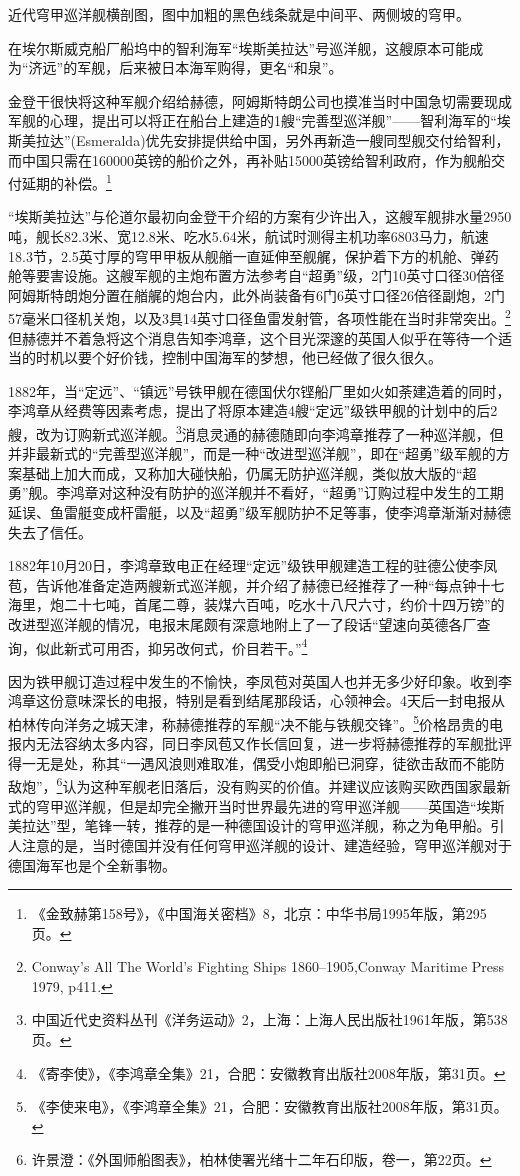 \documentclass[12pt,UTF8]{ctexbook}
\begin{document}
近代穹甲巡洋舰横剖图，图中加粗的黑色线条就是中间平、两侧坡的穹甲。

在埃尔斯威克船厂船坞中的智利海军“埃斯美拉达”号巡洋舰，这艘原本可能成为“济远”的军舰，后来被日本海军购得，更名“和泉”。

金登干很快将这种军舰介绍给赫德，阿姆斯特朗公司也摸准当时中国急切需要现成军舰的心理，提出可以将正在船台上建造的1艘“完善型巡洋舰”——智利海军的“埃斯美拉达”(Esmeralda)优先安排提供给中国，另外再新造一艘同型舰交付给智利，而中国只需在160000英镑的船价之外，再补贴15000英镑给智利政府，作为舰船交付延期的补偿。\footnote{《金致赫第158号》，《中国海关密档》8，北京：中华书局1995年版，第295页。}

“埃斯美拉达”与伦道尔最初向金登干介绍的方案有少许出入，这艘军舰排水量2950吨，舰长82.3米、宽12.8米、吃水5.64米，航试时测得主机功率6803马力，航速18.3节，2.5英寸厚的穹甲甲板从舰艏一直延伸至舰艉，保护着下方的机舱、弹药舱等要害设施。这艘军舰的主炮布置方法参考自“超勇”级，2门10英寸口径30倍径阿姆斯特朗炮分置在艏艉的炮台内，此外尚装备有6门6英寸口径26倍径副炮，2门57毫米口径机关炮，以及3具14英寸口径鱼雷发射管，各项性能在当时非常突出。\footnote{Conway's All The World's Fighting Ships 1860--1905,Conway Maritime Press 1979, p411.}但赫德并不着急将这个消息告知李鸿章，这个目光深邃的英国人似乎在等待一个适当的时机以要个好价钱，控制中国海军的梦想，他已经做了很久很久。

1882年，当“定远”、“镇远”号铁甲舰在德国伏尔铿船厂里如火如荼建造着的同时，李鸿章从经费等因素考虑，提出了将原本建造4艘“定远”级铁甲舰的计划中的后2艘，改为订购新式巡洋舰。\footnote{中国近代史资料丛刊《洋务运动》2，上海：上海人民出版社1961年版，第538页。}消息灵通的赫德随即向李鸿章推荐了一种巡洋舰，但并非最新式的“完善型巡洋舰”，而是一种“改进型巡洋舰”，即在“超勇”级军舰的方案基础上加大而成，又称加大碰快船，仍属无防护巡洋舰，类似放大版的“超勇”舰。李鸿章对这种没有防护的巡洋舰并不看好，“超勇”订购过程中发生的工期延误、鱼雷艇变成杆雷艇，以及“超勇”级军舰防护不足等事，使李鸿章渐渐对赫德失去了信任。

1882年10月20日，李鸿章致电正在经理“定远”级铁甲舰建造工程的驻德公使李凤苞，告诉他准备定造两艘新式巡洋舰，并介绍了赫德已经推荐了一种“每点钟十七海里，炮二十七吨，首尾二尊，装煤六百吨，吃水十八尺六寸，约价十四万镑”的改进型巡洋舰的情况，电报末尾颇有深意地附上了一了段话“望速向英德各厂查询，似此新式可用否，抑另改何式，价目若干。”\footnote{《寄李使》，《李鸿章全集》21，合肥：安徽教育出版社2008年版，第31页。}

因为铁甲舰订造过程中发生的不愉快，李凤苞对英国人也并无多少好印象。收到李鸿章这份意味深长的电报，特别是看到结尾那段话，心领神会。4天后一封电报从柏林传向洋务之城天津，称赫德推荐的军舰“决不能与铁舰交锋”。\footnote{《李使来电》，《李鸿章全集》21，合肥：安徽教育出版社2008年版，第31页。}价格昂贵的电报内无法容纳太多内容，同日李凤苞又作长信回复，进一步将赫德推荐的军舰批评得一无是处，称其“一遇风浪则难取准，偶受小炮即船已洞穿，徒欲击敌而不能防敌炮”，\footnote{许景澄：《外国师船图表》，柏林使署光绪十二年石印版，卷一，第22页。}认为这种军舰老旧落后，没有购买的价值。并建议应该购买欧西国家最新式的穹甲巡洋舰，但是却完全撇开当时世界最先进的穹甲巡洋舰——英国造“埃斯美拉达”型，笔锋一转，推荐的是一种德国设计的穹甲巡洋舰，称之为龟甲船。引人注意的是，当时德国并没有任何穹甲巡洋舰的设计、建造经验，穹甲巡洋舰对于德国海军也是个全新事物。
\end{document}
